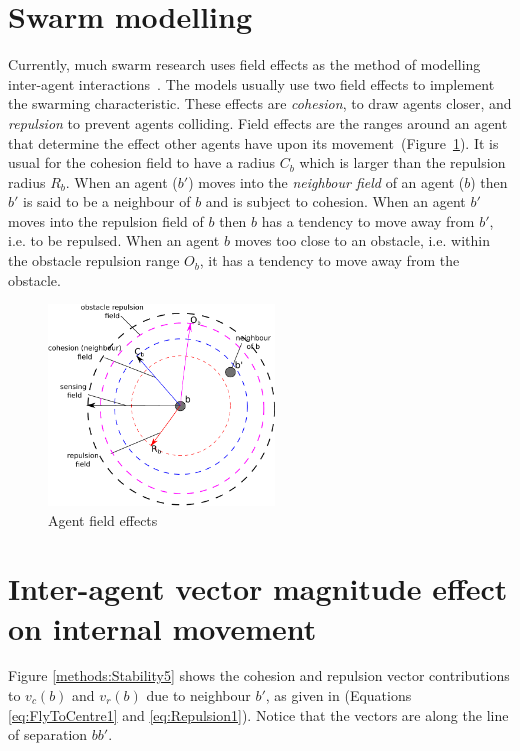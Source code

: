 \documentclass[10pt,journal,letterpaper,twoside]{IEEEtran}
\begin{document}
\section{Swarm modelling}
Currently, much swarm research uses field effects as the method of modelling inter-agent interactions~\cite{BAF:06, BAFVM:06, BM:09, APZDAMC:09, GP:02, GP:04, GP:04a, GP:05, GP:11, MYP:09}. The models usually use two field effects to implement the swarming characteristic. These effects are \textit{cohesion}, to draw agents closer, and \textit{repulsion} to prevent agents colliding. Field effects are the ranges around an agent that determine the effect other agents have upon its movement~(Figure~\ref{methods:FieldEffects}). It is usual for the cohesion field to have a radius $C_b$ which is larger than the repulsion radius $R_b$. When an agent ($b'$) moves into the \textit{neighbour field} of an agent ($b$) then $b'$ is said to be a neighbour of $b$ and is subject to cohesion. When an agent $b'$ moves into the repulsion field of $b$ then $b$ has a tendency to move away from $b'$, i.e. to be repulsed. When an agent $b$ moves too close to an obstacle, i.e. within the obstacle repulsion range $O_b$, it has a tendency to move away from the obstacle.

\begin{figure}[H]
\begin{center}
\includegraphics[width=6cm]{figures/FieldEffects}
\end{center}
\caption{Agent field effects\label{methods:FieldEffects}}
\end{figure}

\section{Inter-agent vector magnitude effect on internal movement}\label{Section:StabilityMagnitude}
Figure \ref{methods:Stability5} shows the cohesion and repulsion vector contributions to $v_c(b)$ and $v_r(b)$ due to neighbour $b'$, as given in (Equations \ref{eq:FlyToCentre1} and \ref{eq:Repulsion1}). Notice that the vectors are along the line of separation $bb'$. \\
\end{document}
